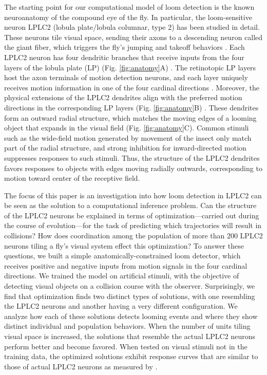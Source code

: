 \documentclass[pdftex,9pt,lineno]{elife}
\begin{document}
The starting point for our computational model of loom detection is the known neuroanatomy of the compound eye of the fly.
In particular, the loom-sensitive neuron LPLC2 (lobula plate/lobula columnar, type 2) \citep{wu2016visual} has been studied in detail. These neurons tile visual space, sending their axons to a descending neuron called the giant fiber, which triggers  the fly's jumping and takeoff behaviors \citep{card2008visually,ache2019neural}. Each LPLC2 neuron has four dendritic branches that receive inputs from the four layers of the lobula plate (LP) (Fig. \ref{fig:anatomy}A) \citep{maisak2013directional,klapoetke2017ultra}. The retinotopic LP layers host the axon terminals of motion detection neurons, and each layer uniquely receives motion information in one of the four cardinal directions \citep{maisak2013directional}. Moreover, the physical extensions of the LPLC2 dendrites align with the preferred motion directions in the corresponding LP layers (Fig. \ref{fig:anatomy}B) \citep{klapoetke2017ultra}. These dendrites form an outward radial structure, which matches the moving edges of a looming object that expands in the visual field (Fig. \ref{fig:anatomy}C). Common stimuli such as the wide-field motion generated by movement of the insect only match part of the radial structure, and strong inhibition for inward-directed motion suppresses responses to such stimuli. Thus, the structure of the LPLC2 dendrites favors responses to objects with edges moving radially outwards, corresponding to motion toward center of the receptive field.


The focus of this paper is an investigation into how loom detection in LPLC2 can be seen as the solution to a computational inference problem. Can the structure of the LPLC2 neurons be explained in terms of optimization---carried out during the course of evolution---for the task of predicting which trajectories will result in collisions?
How does coordination among the population of more than 200 LPLC2 neurons tiling a fly's visual system effect this optimization?  To answer these questions, we built a simple anatomically-constrained loom detector, which receives positive and negative inputs from motion signals in the four cardinal directions. We trained the model on artificial stimuli, with the objective of  detecting visual objects on a collision course with the observer. Surprisingly, we find that optimization finds two distinct types of solutions, with one resembling the LPLC2 neurons and another having a very different configuration. We analyze how each of these solutions detects looming events and where they show distinct individual and population behaviors.
When the number of units tiling visual space is increased, the solutions that resemble the actual LPLC2 neurons perform better and become favored. When tested on visual stimuli not in the training data, the optimized solutions exhibit response curves that are similar to those of actual LPLC2 neurons as measured by \cite{klapoetke2017ultra}.
\end{document}
